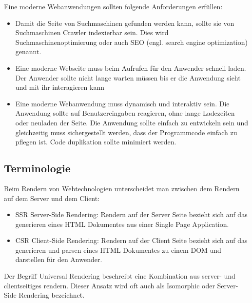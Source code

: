 \documentclass[runningheads]{llncs}
\begin{document}
Eine moderne Webanwendungen sollten folgende Anforderungen erfüllen:
\begin{itemize}
  \item Damit die Seite von Suchmaschinen gefunden werden kann, sollte sie von Suchmaschinen Crawler indexierbar sein. 
  Dies wird Suchmaschinenoptimierung oder auch SEO 
  (engl. search engine optimization) genannt. 
  \item Eine moderne Webseite muss beim Aufrufen für den Anwender schnell laden. Der Anwender sollte nicht lange warten 
  müssen bis er die Anwendung sieht und mit ihr interagieren kann
  \item Eine moderne Webanwendung muss dynamisch und interaktiv sein. Die Anwendung sollte auf Benutzereingaben reagieren, 
  ohne lange Ladezeiten oder neuladen der Seite.
  Die Anwendung sollte einfach zu entwickeln sein und gleichzeitig muss sichergestellt werden, 
  dass der Programmcode einfach zu pflegen ist. 
  Code duplikation sollte minimiert werden.
\end{itemize}

\subsection{Terminologie}
\label{subsec:Terminologie}
Beim Rendern von Webtechnologien unterscheidet man zwischen dem Rendern auf dem Server und dem Client:

\begin{itemize}
  \item SSR Server-Side Rendering: Rendern auf der Server Seite bezieht sich auf das generieren eines HTML Dokumentes 
  aus einer Single Page Application. 
  \item CSR Client-Side Rendering: Rendern auf der Client Seite bezieht sich auf das generieren und parsen eines 
  HTML Dokumentes zu einem DOM und darstellen für den Anwender. 
\end{itemize}
Der Begriff Universal Rendering beschreibt eine Kombination aus server- und clientseitiges rendern. 
Dieser Ansatz wird oft auch als Isomorphic oder Server-Side Rendering bezeichnet.
\end{document}
